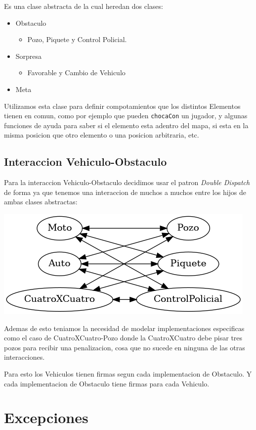 \documentclass[titlepage,a4paper]{article}
\begin{document}
Es una clase abstracta de la cual heredan dos clases:

\begin{itemize}
\item Obstaculo
\begin{itemize}
\item Pozo, Piquete y Control Policial.
\end{itemize}
\item Sorpresa
\begin{itemize}
\item Favorable y Cambio de Vehiculo
\end{itemize}
\item Meta
\end{itemize}

Utilizamos esta clase para definir compotamientos que los distintos
Elementos tienen en comun, como por ejemplo que pueden \texttt{chocaCon} un
jugador, y algunas funciones de ayuda para saber si el elemento esta
adentro del mapa, si esta en la misma posicion que otro elemento o una
posicion arbitraria, etc.

\subsection{Interaccion Vehiculo-Obstaculo}
\label{sec:org8f3d271}

Para la interaccion Vehiculo-Obstaculo decidimos usar el patron \emph{Double
Dispatch} de forma ya que tenemos una interaccion de muchos a muchos entre los
hijos de ambas clases abstractas:

\begin{center}
\includegraphics[width=.9\linewidth]{diagramas/interaccionVehiculoObstaculo.png}
\end{center}

Ademas de esto teniamos la necesidad de modelar implementaciones especificas
como el caso de CuatroXCuatro-Pozo donde la CuatroXCuatro debe pisar tres pozos
para recibir una penalizacion, cosa que no sucede en ninguna de las otras interacciones.

Para esto los Vehiculos tienen firmas segun cada implementacion de Obstaculo.
Y cada implementacion de Obstaculo tiene firmas para cada Vehiculo.

\section{Excepciones}
\label{sec:org12b8a92}
\end{document}
